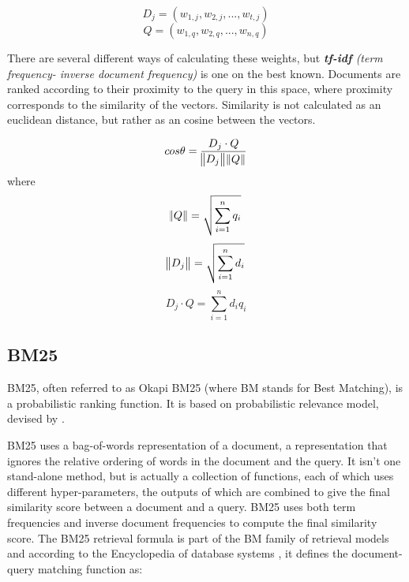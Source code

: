 \begin{equation}
D_j = (w_{1,j}, w_{2,j},...,w_{t,j})
\end{equation}
\begin{equation}
Q = (w_{1,q}, w_{2,q},...,w_{n,q}) 
\end{equation}

There are several different ways of calculating these weights, but \textit{\textbf{tf-idf} (term frequency- inverse document frequency)} is one on the best known. Documents are ranked according to their proximity to the query in this space, where proximity corresponds to the similarity of the vectors. Similarity is not calculated as an euclidean distance, but rather as an cosine between the vectors.

\begin{equation}
cos\theta = \frac{D_j \cdot Q}{\norm{D_j} \norm{Q}}  
\end{equation} 
where
\begin{equation}
\norm{Q} = \sqrt{\sum\limits_{i=1}^n q_i }
\end{equation}
\begin{equation}
\norm{D_j} = \sqrt{\sum\limits_{i=1}^n d_i }
\end{equation}
\begin{equation}
D_j \cdot Q = \sum\limits_{i=1}^n d_i q_i
\end{equation}

\subsection{BM25}

BM25, often referred to as Okapi BM25 (where BM stands for Best Matching), is a probabilistic ranking function. It is based on probabilistic relevance model, devised by \citep{robertson1996okapi}. 

BM25 uses a bag-of-words representation of a document, a representation that ignores the relative ordering of words in the document and the query. It isn't one stand-alone method, but is actually a collection of functions, each of which uses different hyper-parameters, the outputs of which are combined to give the final similarity score between a document and a query. BM25 uses both term frequencies and inverse document frequencies to compute the final similarity score. The BM25 retrieval formula is part of the BM family of retrieval models and according to the Encyclopedia of database systems \citep{amati2009bm25}, it defines the document-query matching function as:

